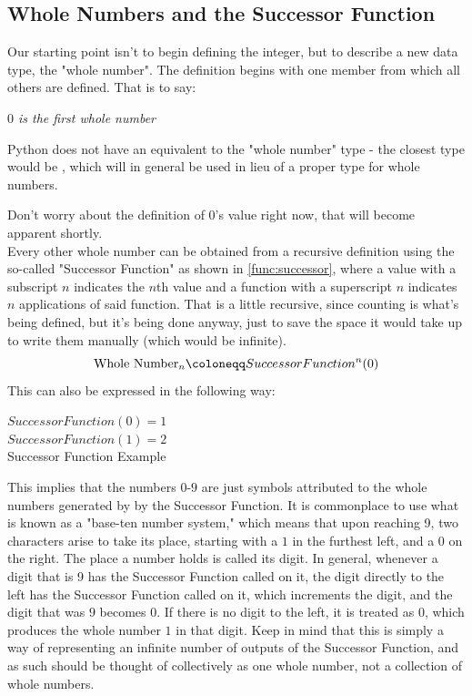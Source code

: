 \subsection{Whole Numbers and the Successor Function}
Our starting point isn't to begin defining the integer, but to describe a new data type, the "whole number". The definition begins with one member from which all others are defined. That is to say:
\begin{center}
\textit{$0$ is the first whole number}
\end{center}

Python does not have an equivalent to the "whole number" type - the closest type would be , which will in general be used in lieu of a proper type for whole numbers.

Don't worry about the definition of $0$'s value right now, that will become apparent shortly.\\
Every other whole number can be obtained from a recursive definition using the so-called "Successor Function" as shown in \ref{func:successor}, where a value with a subscript $n$ indicates the $n$th value and a function with a superscript $n$ indicates $n$ applications of said function. That is a little recursive, since counting is what's being defined, but it's being done anyway, just to save the space it would take up to write them manually (which would be infinite).
\begin{equation}\label{func:successor}
\textnormal{Whole Number}_n \coloneqq SuccessorFunction^n(0)
\end{equation}
This can also be expressed in the following way:
\begin{center}
$SuccessorFunction(0) = 1$\\
$SuccessorFunction(1) = 2$\\
Successor Function Example\label{eq:sucFuncEx}
\end{center}
This implies that the numbers $0$-$9$ are just symbols attributed to the whole numbers generated by by the Successor Function. It is commonplace to use what is known as a "base-ten number system," which means that upon reaching 9, two characters arise to take its place, starting with a $1$ in the furthest left, and a $0$ on the right. The place a number holds is called its digit. In general, whenever a digit that is 9 has the Successor Function called on it, the digit directly to the left has the Successor Function called on it, which increments the digit, and the digit that was $9$ becomes $0$. If there is no digit to the left, it is treated as $0$, which produces the whole number $1$ in that digit. Keep in mind that this is simply a way of representing an infinite number of outputs of the Successor Function, and as such should be thought of collectively as one whole number, not a collection of whole numbers. \\



